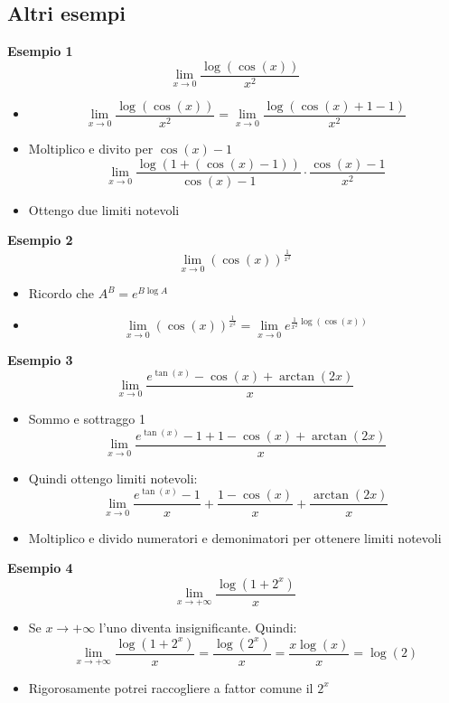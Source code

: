 \subsection{Altri esempi}
\textbf{Esempio 1}
\[
\lim_{x \to  0} \frac{\log \left( \cos \left( x \right)  \right) }{x^2}  
\]
\begin{itemize}
	\item
	\[
\lim_{x \to  0} \frac{\log \left( \cos \left( x \right)  \right) }{x^2}  = \lim_{x \to 0} \frac{\log\left( \cos \left( x \right) +1 -1 \right) }{x^2} 
	\] 
	\item Moltiplico e divito per $\cos\left( x \right) -1$
	\[
	\lim_{x \to 0} \frac{\log \left( 1+ \left( \cos \left( x \right) -1 \right)  \right) }{\cos \left( x \right) -1} \cdot \frac{\cos \left( x \right) -1}{x^2} 
	\] 
	\item Ottengo due limiti notevoli
\end{itemize}
\textbf{Esempio 2}
\[
\lim_{x \to 0} \left( \cos\left( x \right) \right) ^{\frac{1}{x^2}}  
\] 
\begin{itemize}
	\item Ricordo che $A^{B}=e^{B\log A}$
	\item 
	\[
\lim_{x \to 0} \left( \cos\left( x \right) \right) ^{\frac{1}{x^2}}  = \lim_{x \to 0} e^{\frac{1}{x^2}\log\left( \cos\left( x \right)  \right) } 
	\] 
\end{itemize}
\textbf{Esempio 3}
\[
\lim_{x \to 0} \frac{e^{\tan \left( x \right) }- \cos\left( x \right) + \arctan \left( 2x \right) }{x} 
\]
\begin{itemize}
	\item Sommo e sottraggo 1
\[
\lim_{x \to 0} \frac{e^{\tan \left( x \right) }-1 + 1- \cos\left( x \right) + \arctan \left( 2x \right) }{x} 
\] 
	\item Quindi ottengo limiti notevoli:
	\[
	\lim_{x \to 0} \frac{e^{\tan \left( x \right) }-1}{x}+ \frac{1-\cos\left( x \right) }{x} + \frac{\arctan \left( 2x \right) }{x} 
	\] 
	\item Moltiplico e divido numeratori e demonimatori per ottenere limiti notevoli
\end{itemize}
\textbf{Esempio 4}
\[
\lim_{x \to +\infty} \frac{\log\left( 1+2^{x} \right) }{x} 
\]
\begin{itemize}
	\item Se $x \to + \infty$ l'uno diventa insignificante. Quindi:
	\[
	\lim_{x \to +\infty} \frac{\log\left( 1+2^{x} \right) }{x}= \frac{\log\left( 2^{x} \right) }{x} = \frac{x \log\left( x \right) }{x}  = \log\left( 2 \right) 
	\] 
	\item Rigorosamente potrei raccogliere a fattor comune il $2^{x}$
\end{itemize}
